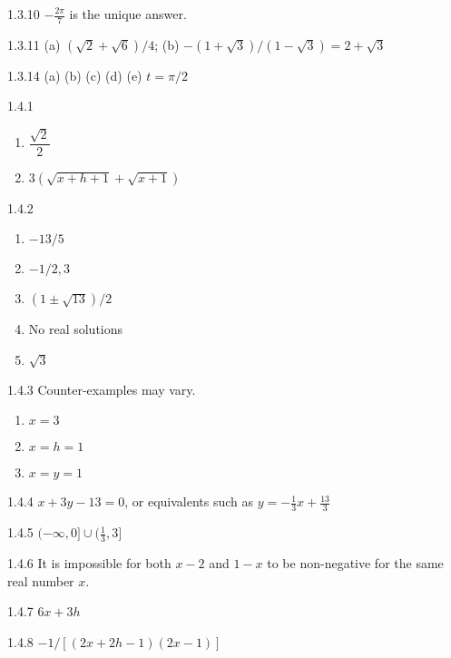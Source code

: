 \begin{Answer}{1.3.10}
$-\frac{2\pi}{7}$ is the unique answer.
\end{Answer}
\begin{Answer}{1.3.11}
(a) $(\sqrt{2}+\sqrt{6})/4$; \hspace{1cm} (b) $-(1+\sqrt3)/(1-\sqrt3)=2+\sqrt3$
\end{Answer}
\begin{Answer}{1.3.14}
 (a)  (b) (c) (d) (e) $t=\pi/2$
\end{Answer}
\begin{Answer}{1.4.1}
\begin{enumerate}
	\item	$\dfrac{\sqrt{2}}{2}$
	\item	$3(\sqrt{x+h+1}+\sqrt{x+1})$
\end{enumerate}
\end{Answer}
\begin{Answer}{1.4.2}
\begin{enumerate}
	\item	$-13/5$
	\item	$-1/2,3$
	\item	$(1\pm\sqrt{13})/2$
	\item	No real solutions
	\item	$\sqrt{3}$
\end{enumerate}
\end{Answer}
\begin{Answer}{1.4.3}
Counter-examples may vary.
\begin{enumerate}
	\item	$x=3$
	\item	$x=h=1$
	\item	$x=y=1$
\end{enumerate}
\end{Answer}
\begin{Answer}{1.4.4}
	$x+3y-13=0$, or equivalents such as $y=-\frac{1}{3}x+\frac{13}{3}$
\end{Answer}
\begin{Answer}{1.4.5}
	$(-\infty,0]\cup(\frac{1}{3},3]$
\end{Answer}
\begin{Answer}{1.4.6}
	It is impossible for both $x-2$ and $1-x$ to be non-negative
	for the same real number $x$.
\end{Answer}
\begin{Answer}{1.4.7}
	$6x+3h$
\end{Answer}
\begin{Answer}{1.4.8}
	$-1/\left[(2x+2h-1)(2x-1)\right]$
\end{Answer}

